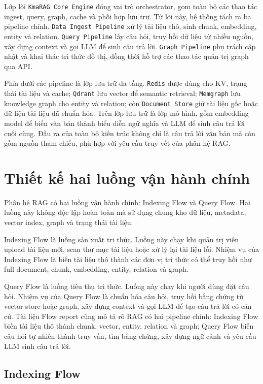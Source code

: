 \documentclass[12pt,a4paper]{report}
\begin{document}
Lớp lõi \texttt{KmaRAG Core Engine} đóng vai trò orchestrator, gom toàn bộ các thao tác ingest, query, graph, cache và phối hợp lưu trữ. Từ lõi này, hệ thống tách ra ba pipeline chính. \texttt{Data Ingest Pipeline} xử lý tài liệu thô, sinh chunk, embedding, entity và relation. \texttt{Query Pipeline} lấy câu hỏi, truy hồi dữ liệu từ nhiều nguồn, xây dựng context và gọi LLM để sinh câu trả lời. \texttt{Graph Pipeline} phụ trách cập nhật và khai thác tri thức đồ thị, đồng thời hỗ trợ các thao tác quản trị graph qua API.

Phía dưới các pipeline là lớp lưu trữ đa tầng. \texttt{Redis} được dùng cho KV, trạng thái tài liệu và cache; \texttt{Qdrant} lưu vector để semantic retrieval; \texttt{Memgraph} lưu knowledge graph cho entity và relation; còn \texttt{Document Store} giữ tài liệu gốc hoặc dữ liệu tài liệu đã chuẩn hóa. Trên lớp lưu trữ là lớp mô hình, gồm embedding model để biến văn bản thành biểu diễn ngữ nghĩa và LLM để sinh câu trả lời cuối cùng. Đầu ra của toàn bộ kiến trúc không chỉ là câu trả lời văn bản mà còn gồm nguồn tham chiếu, phù hợp với yêu cầu truy vết của phân hệ RAG.

\section{Thiết kế hai luồng vận hành chính}

Phân hệ RAG có hai luồng vận hành chính: Indexing Flow và Query Flow. Hai luồng này không độc lập hoàn toàn mà sử dụng chung kho dữ liệu, metadata, vector index, graph và trạng thái tài liệu.

Indexing Flow là luồng sản xuất tri thức. Luồng này chạy khi quản trị viên upload tài liệu mới, scan thư mục tài liệu hoặc xử lý lại tài liệu lỗi. Nhiệm vụ của Indexing Flow là biến tài liệu thô thành các đơn vị tri thức có thể truy hồi như full document, chunk, embedding, entity, relation và graph.

Query Flow là luồng tiêu thụ tri thức. Luồng này chạy khi người dùng đặt câu hỏi. Nhiệm vụ của Query Flow là chuẩn hóa câu hỏi, truy hồi bằng chứng từ vector store hoặc graph, xây dựng context và gọi LLM để tạo câu trả lời có căn cứ. Tài liệu Flow report cũng mô tả rõ RAG có hai pipeline chính: Indexing Flow biến tài liệu thô thành chunk, vector, entity, relation và graph; Query Flow biến câu hỏi tự nhiên thành truy vấn, tìm bằng chứng, xây dựng ngữ cảnh và yêu cầu LLM sinh câu trả lời.

\subsection{Indexing Flow}
\end{document}
